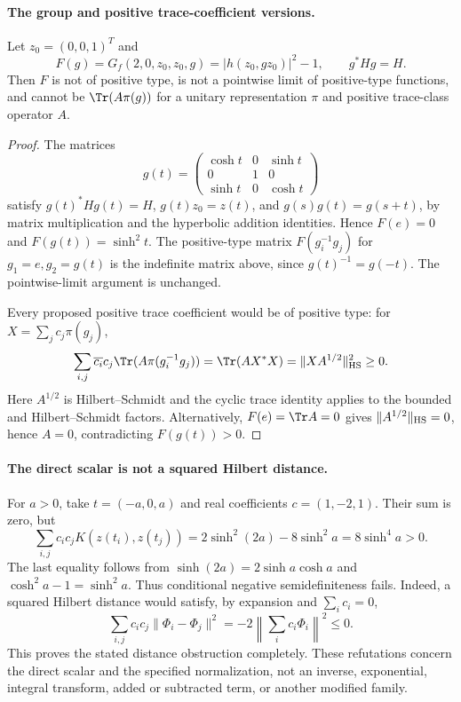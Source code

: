 \paragraph{The group and positive trace-coefficient versions.}
Let \(z_0=(0,0,1)^T\) and
\[
 F(g)=G_f(2,0,z_0,z_0,g)=|h(z_0,gz_0)|^2-1,\qquad g^*Hg=H.
\]
Then \(F\) is not of positive type, is not a pointwise limit of
positive-type functions, and cannot be \(\Tr(A\pi(g))\) for a unitary
representation \(\pi\) and positive trace-class operator \(A\).
\begin{proof}
The matrices
\[
 g(t)=\begin{pmatrix}
 \cosh t&0&\sinh t\\0&1&0\\\sinh t&0&\cosh t
 \end{pmatrix}
\]
satisfy \(g(t)^*Hg(t)=H\), \(g(t)z_0=z(t)\), and
\(g(s)g(t)=g(s+t)\), by matrix multiplication and the hyperbolic
addition identities. Hence \(F(e)=0\) and \(F(g(t))=\sinh^2t\).
The positive-type matrix \(F(g_i^{-1}g_j)\) for \(g_1=e,g_2=g(t)\)
is the indefinite matrix above, since \(g(t)^{-1}=g(-t)\).
The pointwise-limit argument is unchanged.

Every proposed positive trace coefficient would be of positive type:
for \(X=\sum_j c_j\pi(g_j)\),
\[
 \sum_{i,j}\overline{c_i}c_j\Tr(A\pi(g_i^{-1}g_j))
 =\Tr(AX^*X)=\|XA^{1/2}\|_{\rm HS}^2\ge0.
\]
Here \(A^{1/2}\) is Hilbert--Schmidt and the cyclic trace identity
applies to the bounded and Hilbert--Schmidt factors.
Alternatively, \(F(e)=\Tr A=0\) gives
\(\|A^{1/2}\|_{\rm HS}=0\), hence \(A=0\), contradicting
\(F(g(t))>0\).
\end{proof}

\paragraph{The direct scalar is not a squared Hilbert distance.}
For \(a>0\), take \(t=(-a,0,a)\) and real coefficients \(c=(1,-2,1)\).
Their sum is zero, but
\[
 \sum_{i,j}c_ic_jK(z(t_i),z(t_j))
 =2\sinh^2(2a)-8\sinh^2a=8\sinh^4a>0.
\]
The last equality follows from \(\sinh(2a)=2\sinh a\cosh a\) and
\(\cosh^2a-1=\sinh^2a\). Thus conditional negative semidefiniteness
fails. Indeed, a squared Hilbert distance would satisfy, by expansion
and \(\sum_i c_i=0\),
\[
 \sum_{i,j}c_ic_j\|\Phi_i-\Phi_j\|^2
 =-2\left\|\sum_i c_i\Phi_i\right\|^2\le0.
\]
This proves the stated distance obstruction completely. These
refutations concern the direct scalar and the specified normalization,
not an inverse, exponential, integral transform, added or subtracted
term, or another modified family.

